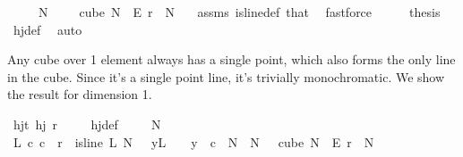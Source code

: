 \begin{isabellebody}
\ \ \ \ \ {\isachardoublequoteopen}N{\isacharprime}{\kern0pt}\ {\isasymge}\ {}{\isachardoublequoteclose}\ {\isachardoublequoteopen}{\isasymchi}\ {\isasymin}\ cube\ N{\isacharprime}{\kern0pt}\ {}\ {\isasymrightarrow}\isactrlsub E\ {\isacharbraceleft}{\kern0pt}{\isachardot}{\kern0pt}{\isachardot}{\kern0pt}{\isacharless}{\kern0pt}r{\isacharbraceright}{\kern0pt}{\isachardoublequoteclose}\ \ N{\isacharprime}{\kern0pt}\ {\isasymchi}\ \isamarkupfalse%
\ assms\ is{\isacharunderscore}{\kern0pt}line{\isacharunderscore}{\kern0pt}def\ that{\isacharparenleft}{\kern0pt}{}{\isacharparenright}{\kern0pt}\ \isamarkupfalse%
\ fastforce\isanewline
\ \ \isamarkupfalse%
\ \isamarkupfalse%
\ {\isacharquery}{\kern0pt}thesis\ \isamarkupfalse%
\ hj{\isacharunderscore}{\kern0pt}def\ \isamarkupfalse%
\ auto\isanewline
{}\isamarkupfalse%
%
\endisatagproof
{\isafoldproof}%
%
\isadelimproof
%
\endisadelimproof
%
\begin{isamarkuptext}%
Any cube over 1 element always has a single point, which also forms the only line in the cube. Since it's a
single point line, it's trivially monochromatic. We show the result for dimension 1.%
\end{isamarkuptext}\isamarkuptrue%
\isamarkupfalse%
\ hj{\isacharunderscore}{\kern0pt}t{\isacharunderscore}{\kern0pt}{}{\isacharcolon}{\kern0pt}\ {\isachardoublequoteopen}hj\ r\ {}{\isachardoublequoteclose}\isanewline
%
\isadelimproof
\ \ %
\endisadelimproof
%
\isatagproof
{}\isamarkupfalse%
\ hj{\isacharunderscore}{\kern0pt}def\ \isanewline
{}\isamarkupfalse%
{\isacharminus}{\kern0pt}\isanewline
\ \ \isamarkupfalse%
\ {\isacharquery}{\kern0pt}N\ {\isacharequal}{\kern0pt}\ {}\isanewline
\ \ \isamarkupfalse%
\ {\isachardoublequoteopen}{\isasymexists}L\ c{\isachardot}{\kern0pt}\ c\ {\isacharless}{\kern0pt}\ r\ {\isasymand}\ is{\isacharunderscore}{\kern0pt}line\ L\ N{\isacharprime}{\kern0pt}\ {}\ {\isasymand}\ {\isacharparenleft}{\kern0pt}{\isasymforall}y{\isasymin}L\ {\isacharbackquote}{\kern0pt}\ {\isacharbraceleft}{\kern0pt}{\isachardot}{\kern0pt}{\isachardot}{\kern0pt}{\isacharless}{\kern0pt}{}{\isacharbraceright}{\kern0pt}{\isachardot}{\kern0pt}\ {\isasymchi}\ y\ {\isacharequal}{\kern0pt}\ c{\isacharparenright}{\kern0pt}{\isachardoublequoteclose}\ \ {\isachardoublequoteopen}N{\isacharprime}{\kern0pt}\ {\isasymge}\ {\isacharquery}{\kern0pt}N{\isachardoublequoteclose}\ {\isachardoublequoteopen}{\isasymchi}\ {\isasymin}\ cube\ N{\isacharprime}{\kern0pt}\ {}\ {\isasymrightarrow}\isactrlsub E\ {\isacharbraceleft}{\kern0pt}{\isachardot}{\kern0pt}{\isachardot}{\kern0pt}{\isacharless}{\kern0pt}r{\isacharbraceright}{\kern0pt}{\isachardoublequoteclose}\ \ N{\isacharprime}{\kern0pt}\ {\isasymchi}\ \isanewline

\end{isabellebody}
